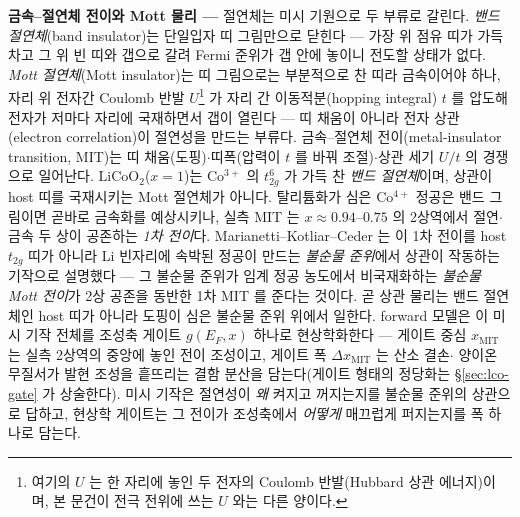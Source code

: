 \begin{bgbox}
\textbf{금속--절연체 전이와 Mott 물리 ---} 절연체는 미시 기원으로 두 부류로 갈린다. \emph{밴드 절연체}(band
insulator)는 단일입자 띠 그림만으로 닫힌다 --- 가장 위 점유 띠가 가득 차고 그 위 빈 띠와 갭으로 갈려 Fermi
준위가 갭 안에 놓이니 전도할 상태가 없다. \emph{Mott 절연체}(Mott insulator)는 띠 그림으로는 부분적으로 찬
띠라 금속이어야 하나, 자리 위 전자간 Coulomb 반발 $U$\footnote{여기의 $U$ 는 한 자리에 놓인 두 전자의 Coulomb
반발(Hubbard 상관 에너지)이며, 본 문건이 전극 전위에 쓰는 $U$ 와는 다른 양이다.} 가 자리 간 이동적분(hopping
integral) $t$ 를 압도해 전자가 저마다 자리에 국재하면서 갭이 열린다 --- 띠 채움이 아니라 전자 상관(electron
correlation)이 절연성을 만드는 부류다\cite{mott1968,imada1998}. 금속--절연체 전이(metal-insulator transition,
MIT)는 띠 채움(도핑)$\cdot$띠폭(압력이 $t$ 를 바꿔 조절)$\cdot$상관 세기 $U/t$ 의 경쟁으로
일어난다\cite{imada1998}. $\mathrm{LiCoO_2}$($x{=}1$)는 Co$^{3+}$ 의 $t_{2g}^6$ 가 가득 찬 \emph{밴드 절연체}이며,
상관이 host 띠를 국재시키는 Mott 절연체가 아니다\cite{menetrier1999}. 탈리튬화가 심은 Co$^{4+}$ 정공은 밴드
그림이면 곧바로 금속화를 예상시키나, 실측 MIT 는 $x\approx0.94$--$0.75$ 의 2상역에서 절연$\cdot$금속 두 상이
공존하는 \emph{1차 전이}다\cite{menetrier1999,reimers1992,motohashi2009}. Marianetti--Kotliar--Ceder 는 이 1차
전이를 host $t_{2g}$ 띠가 아니라 Li 빈자리에 속박된 정공이 만드는 \emph{불순물 준위}에서 상관이 작동하는 기작으로
설명했다 --- 그 불순물 준위가 임계 정공 농도에서 비국재화하는 \emph{불순물 Mott 전이}가 2상 공존을 동반한 1차
MIT 를 준다는 것이다\cite{marianetti2004}. 곧 상관 물리는 밴드 절연체인 host 띠가 아니라 도핑이 심은 불순물 준위
위에서 일한다. forward 모델은 이 미시 기작 전체를 조성축 게이트 $g(E_F,x)$ 하나로 현상학화한다 --- 게이트 중심
$x_\mathrm{MIT}$ 는 실측 2상역의 중앙에 놓인 전이 조성이고, 게이트 폭 $\Delta x_\mathrm{MIT}$ 는 산소 결손$\cdot$
양이온 무질서가 발현 조성을 흩뜨리는 결함 분산을 담는다(게이트 형태의 정당화는 \S\ref{sec:lco-gate} 가 상술한다).
미시 기작은 절연성이 \emph{왜} 켜지고 꺼지는지를 불순물 준위의 상관으로 답하고, 현상학 게이트는 그 전이가
조성축에서 \emph{어떻게} 매끄럽게 퍼지는지를 폭 하나로 담는다.
\end{bgbox}

